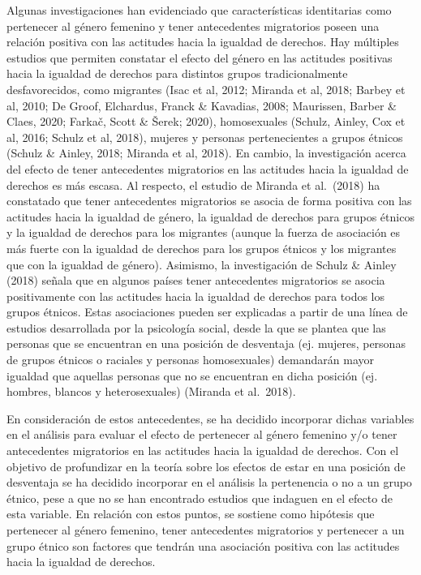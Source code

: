 \documentclass[12pt,twoside]{templates/facsothesis}
\begin{document}
Algunas investigaciones han evidenciado que características identitarias como pertenecer al género femenino y tener antecedentes migratorios poseen una relación positiva con las actitudes hacia la igualdad de derechos. Hay múltiples estudios que permiten constatar el efecto del género en las actitudes positivas hacia la igualdad de derechos para distintos grupos tradicionalmente desfavorecidos, como migrantes (Isac et al, 2012; Miranda et al, 2018; Barbey et al, 2010; De Groof, Elchardus, Franck \& Kavadias, 2008; Maurissen, Barber \& Claes, 2020; Farkač, Scott \& Šerek; 2020), homosexuales (Schulz, Ainley, Cox et al, 2016; Schulz et al, 2018), mujeres y personas pertenecientes a grupos étnicos (Schulz \& Ainley, 2018; Miranda et al, 2018). En cambio, la investigación acerca del efecto de tener antecedentes migratorios en las actitudes hacia la igualdad de derechos es más escasa. Al respecto, el estudio de Miranda et al.~(2018) ha constatado que tener antecedentes migratorios se asocia de forma positiva con las actitudes hacia la igualdad de género, la igualdad de derechos para grupos étnicos y la igualdad de derechos para los migrantes (aunque la fuerza de asociación es más fuerte con la igualdad de derechos para los grupos étnicos y los migrantes que con la igualdad de género). Asimismo, la investigación de Schulz \& Ainley (2018) señala que en algunos países tener antecedentes migratorios se asocia positivamente con las actitudes hacia la igualdad de derechos para todos los grupos étnicos. Estas asociaciones pueden ser explicadas a partir de una línea de estudios desarrollada por la psicología social, desde la que se plantea que las personas que se encuentran en una posición de desventaja (ej. mujeres, personas de grupos étnicos o raciales y personas homosexuales) demandarán mayor igualdad que aquellas personas que no se encuentran en dicha posición (ej. hombres, blancos y heterosexuales) (Miranda et al.~2018).

En consideración de estos antecedentes, se ha decidido incorporar dichas variables en el análisis para evaluar el efecto de pertenecer al género femenino y/o tener antecedentes migratorios en las actitudes hacia la igualdad de derechos. Con el objetivo de profundizar en la teoría sobre los efectos de estar en una posición de desventaja se ha decidido incorporar en el análisis la pertenencia o no a un grupo étnico, pese a que no se han encontrado estudios que indaguen en el efecto de esta variable. En relación con estos puntos, se sostiene como hipótesis que pertenecer al género femenino, tener antecedentes migratorios y pertenecer a un grupo étnico son factores que tendrán una asociación positiva con las actitudes hacia la igualdad de derechos.
\end{document}
